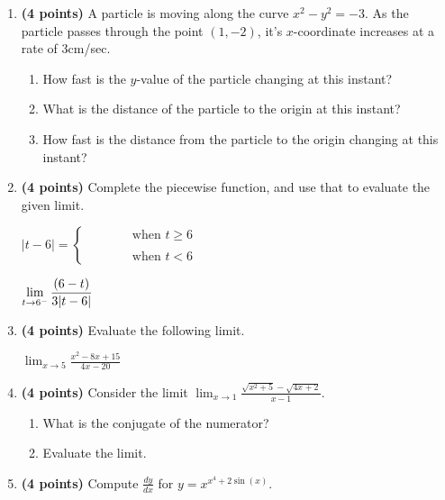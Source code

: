 \documentclass[12pt]{amsart}
\begin{document}
\begin{enumerate}
\vspace{2cm}
\newpage\def \b{1}\def \x{1}\def \y{-2}\def \xchange{3}\def \ratrhs{-2}\def \cirrhs{5}\def \hyprhs{-3}\def \compy{y^{2}}\def \ychangenum{-6}\def \dist{5}\def \fracrat{-18}\def \fraccirc{0}\def \frachyp{12}
\item {\bf (4 points)} 
 A particle is moving along the curve $x^2 - \compy = \hyprhs$. As the particle passes through the point $(\x,\y)$, it's $x$-coordinate increases at a rate of $\xchange$cm/sec. \begin{enumerate}
\item How fast is the $y$-value of the particle changing at this instant? \vfill
\item What is the distance of the particle to the origin at this instant? \vfill
\item How fast is the distance from the particle to the origin changing at this instant? \vfill
\end{enumerate}

\newpage\def \a{6}\def \k{3}\def \abstop{0}\def \ktop{0}
\item {\bf (4 points)} 
 Complete the piecewise function, and use that to evaluate the given limit.

\vspace{.5cm}

$|t- \a| = \begin{cases} \hspace{1cm} & \text{ when } t \geq \a \\ & \\ \hspace{1cm} & \text{ when } t < \a \end{cases}$

\vspace{.5cm}

$\displaystyle \lim_{t \rightarrow \a^-} \frac{\ifthenelse{\ktop=1}{\k}{}\ifthenelse{\abstop=1}{|t-\a|}{(\a-t)}}{\ifthenelse{\ktop=0}{\k}{}\ifthenelse{\abstop=0}{|t-\a|}{(\a-t)}}$

\vfill 
\def \a{5}\def \b{3}\def \k{4}\def \fancyp{x^{2}-8x^{}+15}\def \simplep{4x^{}-20}\def \fancyreduced{2}\def \niceanstop{\frac{1}{2}}\def \niceansbottom{2}
\item {\bf (4 points)} 
 Evaluate the following limit. 

$\displaystyle \lim_{x\rightarrow \a} \frac{\fancyp}{\simplep}$

\vfill 
\newpage\def \a{1}\def \b{3}\def \ab{3}\def \c{5}\def \amb{-2}\def \ansroot{6}\def \firstroot{x^{2}+5}\def \secondroot{4x^{}+2}\def \porm{-1}
\item {\bf (4 points)} 
 Consider the limit $\displaystyle \lim_{x \rightarrow \a} \frac{\sqrt{\firstroot} - \sqrt{\secondroot}}{x-\a}$. \begin{enumerate}
\item What is the conjugate of the numerator? \vspace{3cm}
\item Evaluate the limit.
\end{enumerate}

\vfill 
\def \varexp{4}\def \newexp{3}\def \trigcoeff{2}\def \trigval{+2}\def \oppval{-2}
\item {\bf (4 points)} 
 Compute $\frac{dy}{dx}$ for $y=x^{x^\varexp \trigval \sin(x)}$.

\vfill 
\newpage  $ $   \newpage\end{enumerate} 
\end{document}
